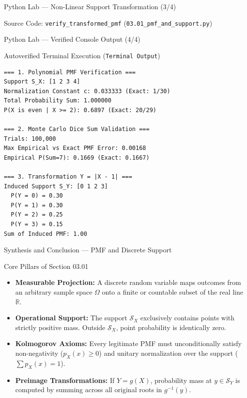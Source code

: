 \documentclass[10pt, aspectratio=169]{beamer}
\begin{document}
\begin{frame}[fragile]{Python Lab — Non-Linear Support Transformation (3/4)}
  \begin{block}{Source Code: \texttt{verify\_transformed\_pmf} (\texttt{03.01\_pmf\_and\_support.py})}
    \fontsize{6pt}{7pt}\selectfont
    
  \end{block}
\end{frame}

\begin{frame}[fragile]{Python Lab — Verified Console Output (4/4)}
  \begin{block}{Autoverified Terminal Execution (\texttt{Terminal Output})}
    \fontsize{6.5pt}{7.5pt}\selectfont
\begin{verbatim}
=== 1. Polynomial PMF Verification ===
Support S_X: [1 2 3 4]
Normalization Constant c: 0.033333 (Exact: 1/30)
Total Probability Sum: 1.000000
P(X is even | X >= 2): 0.6897 (Exact: 20/29)

=== 2. Monte Carlo Dice Sum Validation ===
Trials: 100,000
Max Empirical vs Exact PMF Error: 0.00168
Empirical P(Sum=7): 0.1669 (Exact: 0.1667)

=== 3. Transformation Y = |X - 1| ===
Induced Support S_Y: [0 1 2 3]
  P(Y = 0) = 0.30
  P(Y = 1) = 0.30
  P(Y = 2) = 0.25
  P(Y = 3) = 0.15
Sum of Induced PMF: 1.00
\end{verbatim}
  \end{block}
\end{frame}

\begin{frame}{Synthesis and Conclusion — PMF and Discrete Support}
  \fontsize{7.5pt}{9pt}\selectfont
  \begin{block}{Core Pillars of Section 03.01}
    \fontsize{7.5pt}{9pt}\selectfont
    \begin{itemize}\itemsep=0.12cm
      \item \textbf{Measurable Projection:} A discrete random variable maps outcomes from an arbitrary sample space $\Omega$ onto a finite or countable subset of the real line $\mathbb{R}$.
      \item \textbf{Operational Support:} The support $\mathcal{S}_X$ exclusively contains points with strictly positive mass. Outside $\mathcal{S}_X$, point probability is identically zero.
      \item \textbf{Kolmogorov Axioms:} Every legitimate PMF must unconditionally satisfy non-negativity ($p_X(x) \ge 0$) and unitary normalization over the support ($\sum p_X(x) = 1$).
      \item \textbf{Preimage Transformations:} If $Y=g(X)$, probability mass at $y \in \mathcal{S}_Y$ is computed by summing across all original roots in $g^{-1}(y)$.
    \end{itemize}
  \end{block}
\end{frame}
\end{document}

